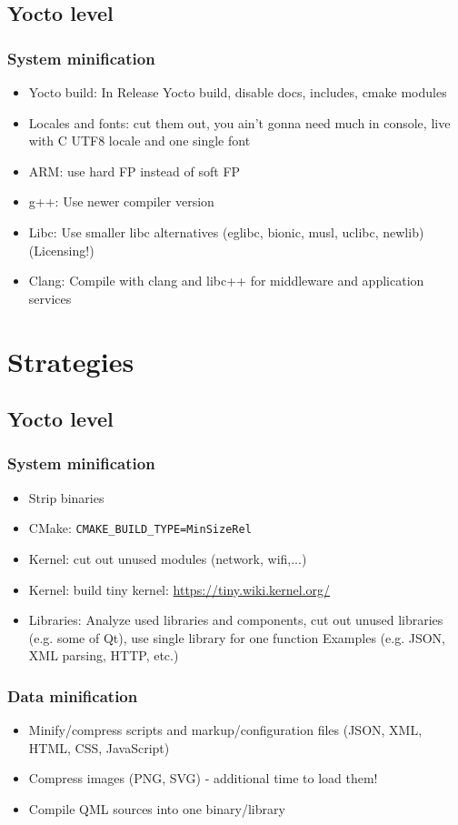 \documentclass{beamer}
\newcommand{\codeinline}[1] {\texttt{\small #1}}
\begin{document}
\subsection{Yocto level}
\begin{frame}
\frametitle{System minification}
	\begin{itemize}
		\item Yocto build: In Release Yocto build, disable docs, includes, cmake modules
		\item Locales and fonts: cut them out, you ain't gonna need much in console, live with C UTF8 locale and one single font
		\item ARM: use hard FP instead of soft FP
		\item g++: Use newer compiler version
		\item Libc: Use smaller libc alternatives (eglibc, bionic, musl, uclibc, newlib) (Licensing!)
		\item Clang: Compile with clang and libc++ for middleware and application services
	\end{itemize}
\end{frame}

\section{Strategies}

\subsection{Yocto level}

\begin{frame}
\frametitle{System minification}
    \begin{itemize}
        \item Strip binaries
        \item CMake: \codeinline{CMAKE\_BUILD\_TYPE=MinSizeRel}
        \item Kernel: cut out unused modules (network, wifi,...)
        \item Kernel: build tiny kernel: \url{https://tiny.wiki.kernel.org/}
        \item Libraries: Analyze used libraries and components, cut out unused libraries (e.g. some of Qt), use single library for one function Examples (e.g. JSON, XML parsing, HTTP, etc.)
    \end{itemize}
\end{frame}

\begin{frame}
\frametitle{Data minification}
	\begin{itemize}
		\item Minify/compress scripts and markup/configuration files (JSON, XML, HTML, CSS, JavaScript)
		\item Compress images (PNG, SVG) - additional time to load them!
		\item Compile QML sources into one binary/library
	\end{itemize}
\end{frame}
\end{document}
